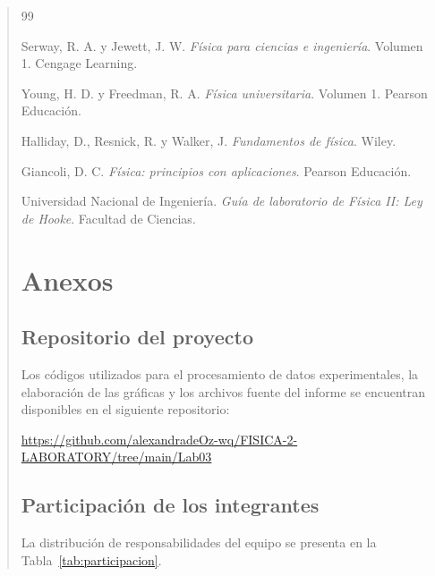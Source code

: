 \documentclass[11pt,a4paper]{article}
\begin{document}
\begin{quote}
\newpage

\begin{thebibliography}{99}

Serway, R. A. y Jewett, J. W.
\textit{Física para ciencias e ingeniería}.
Volumen 1. Cengage Learning.

Young, H. D. y Freedman, R. A.
\textit{Física universitaria}.
Volumen 1. Pearson Educación.

Halliday, D., Resnick, R. y Walker, J.
\textit{Fundamentos de física}.
Wiley.

Giancoli, D. C.
\textit{Física: principios con aplicaciones}.
Pearson Educación.

Universidad Nacional de Ingeniería.
\textit{Guía de laboratorio de Física II:
Ley de Hooke}.
Facultad de Ciencias.

\end{thebibliography}

\newpage


\newpage
\section{Anexos}

\subsection{Repositorio del proyecto}

Los códigos utilizados para el procesamiento de
datos experimentales, la elaboración de las gráficas
y los archivos fuente del informe se encuentran
disponibles en el siguiente repositorio:

\begin{center}
    \url{https://github.com/alexandradeOz-wq/FISICA-2-LABORATORY/tree/main/Lab03}
\end{center}

\subsection{Participación de los integrantes}

La distribución de responsabilidades del equipo
se presenta en la Tabla~\ref{tab:participacion}.

\begin{table}[H]
    \centering
    \label{tab:participacion}
    \renewcommand{\arraystretch}{1.4}
    \small


\end{table}
\end{quote}
\end{document}
